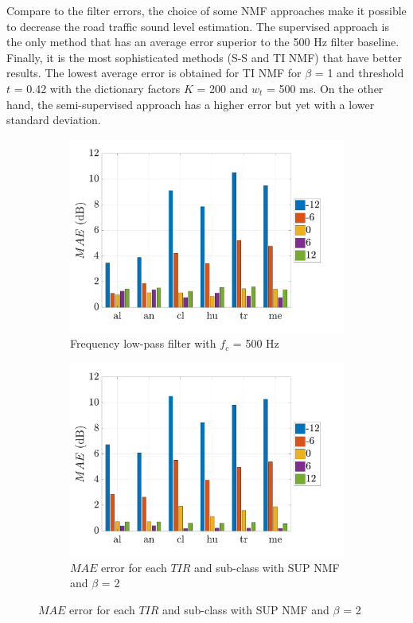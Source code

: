 \documentclass[twocolumn,a4paper,10pt]{article}
\begin{document}
Compare to the filter errors, the choice of some NMF approaches make it possible to decrease the road traffic sound level estimation. The supervised approach is the only method that has an average error superior to the 500 Hz filter baseline. Finally, it is the most sophisticated methods (S-S and TI NMF) that have better results. The lowest average error is obtained for TI NMF for $\beta$ = 1 and threshold $t$ = 0.42 with the dictionary factors $K$ = 200 and $w_t$ = 500 ms. On the other hand, the semi-supervised approach has a higher error but yet with a lower standard deviation.

\begin{figure}[t]
    \centering
    \begin{subfigure}[t]{0.45\textwidth}
        \centering
        \includegraphics[width=\linewidth]{figures/filter_bar.pdf}
        \caption{Frequency low-pass filter with $f_c$ = 500 Hz}
        \label{fig:TIR_class_filter}
    \end{subfigure}%
    \hfill
    \begin{subfigure}[t]{0.45\textwidth}
        \centering
        \includegraphics[width=\linewidth]{figures/sup_bar.pdf}
        \caption{$MAE$ error for each $TIR$ and sub-class with SUP NMF and $\beta$ = 2}
                \label{fig:TIR_class_sup}
    \end{subfigure}


\end{figure}
\end{document}
